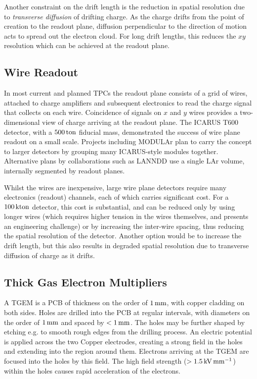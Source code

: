 Another constraint on the drift length is the reduction in spatial resolution due to \emph{transverse diffusion} of drifting charge. As the charge drifts from the point of creation to the readout plane, diffusion perpendicular to the direction of motion acts to spread out the electron cloud. For long drift lengths, this reduces the $xy$ resolution which can be achieved at the readout plane.

\subsection{Wire Readout}
In most current and planned \acsp{TPC} the readout plane consists of a grid of wires, attached to charge amplifiers and subsequent electronics to read the charge signal that collects on each wire. Coincidence of signals on $x$ and $y$ wires provides a two-dimensional view of charge arriving at the readout plane. The ICARUS T600\citep{Amerio2004} detector, with a $500\,\mathrm{ton}$ fiducial mass, demonstrated the success of wire plane readout on a small scale. Projects including MODULAr\citep{Baibussinov2008} plan to carry the concept to larger detectors by grouping many ICARUS-style modules together. Alternative plans by collaborations such as LANNDD\citep{Cline2003} use a single \ac{LAr} volume, internally segmented by readout planes.

Whilst the wires are inexpensive, large wire plane detectors require many electronics (readout) channels, each of which carries significant cost. For a $100\,\mathrm{kton}$ detector, this cost is substantial, and can be reduced only by using longer wires (which requires higher tension in the wires themselves, and presents an engineering challenge) or by increasing the inter-wire spacing, thus reducing the spatial resolution of the detector. Another option would be to increase the drift length, but this also results in degraded spatial resolution due to transverse diffusion of charge as it drifts.

\subsection{Thick Gas Electron Multipliers}
A \ac{TGEM} is a \ac{PCB} of thickness on the order of $1\,\mathrm{mm}$, with copper cladding on both sides. Holes are drilled into the \ac{PCB} at regular intervals, with diameters on the order of $1\,\mathrm{mm}$ and spaced by $< 1\,\mathrm{mm}$. The holes may be further shaped by etching e.g. to smooth rough edges from the drilling process. An electric potential is applied across the two Copper electrodes, creating a strong field in the holes and extending into the region around them. Electrons arriving at the \ac{TGEM} are focused into the holes by this field. The high field strength ($> 1.5 \,\mathrm{kV} \,\mathrm{mm}^{-1}$) within the holes causes rapid acceleration of the electrons.

